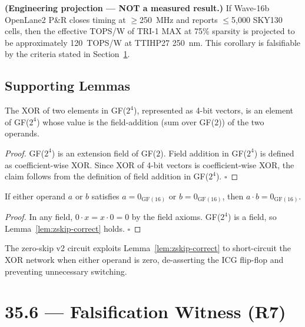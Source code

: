 \begin{corollary}\label{cor:tops-per-watt}
\textbf{(Engineering projection --- NOT a measured result.)}
If Wave-16b OpenLane2 P\&R closes timing at $\geq$250~MHz and reports
$\leq$5,000 SKY130 cells,
then the effective TOPS/W of TRI-1 MAX at 75\% sparsity is
projected to be approximately 120~TOPS/W at TTIHP27 250~nm.
This corollary is falsifiable by the criteria stated in
Section~\ref{sec:glava35-falsifier}.
\end{corollary}

\subsection{Supporting Lemmas}

\begin{lemma}\label{lem:gf16-closure}
The XOR of two elements in GF(\(2^4\)), represented as 4-bit vectors,
is an element of GF(\(2^4\)) whose value is the field-addition (sum over GF(\(2\))) of the two operands.
\end{lemma}

\begin{proof}
GF(\(2^4\)) is an extension field of GF(\(2\)).
Field addition in GF(\(2^4\)) is defined as coefficient-wise XOR.
Since XOR of 4-bit vectors is coefficient-wise XOR, the claim follows
from the definition of field addition in GF(\(2^4\)). \(\square\)
\end{proof}

\begin{lemma}\label{lem:zskip-correct}
If either operand \(a\) or \(b\) satisfies \(a = 0_{\mathrm{GF}(16)}\)
or \(b = 0_{\mathrm{GF}(16)}\), then \(a \cdot b = 0_{\mathrm{GF}(16)}\).
\end{lemma}

\begin{proof}
In any field, \(0 \cdot x = x \cdot 0 = 0\) by the field axioms.
GF(\(2^4\)) is a field, so Lemma~\ref{lem:zskip-correct} holds. \(\square\)
\end{proof}

The zero-skip v2 circuit exploits Lemma~\ref{lem:zskip-correct} to
short-circuit the XOR network when either operand is zero, de-asserting
the ICG flip-flop and preventing unnecessary switching.

\section{35.6 --- Falsification Witness (R7)}
\label{sec:glava35-falsifier}

